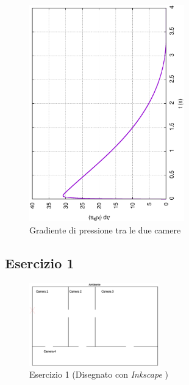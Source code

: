 \documentclass{article}
\begin{document}
        \begin{figure}[h!]
            \centering
            \label{fig:grad_cam_ex}
            \includegraphics[width=0.6\textwidth, angle=-90]{MUL2/Esercitazione1/1A/Dp.eps}
            \caption{Gradiente di pressione tra le due camere}
        \end{figure}


        \clearpage
        \subsection{Esercizio 1\label{Es1}} 

        \begin{figure}[h!]
            \centering
            \label{fig:Esercizio_1}
            \includegraphics[width=0.5\textwidth]{ES1_Esercizio1.eps}
            \caption{Esercizio 1 (Disegnato con \textit{Inkscape} \autocite{Inkscape})}
        \end{figure}
\end{document}
